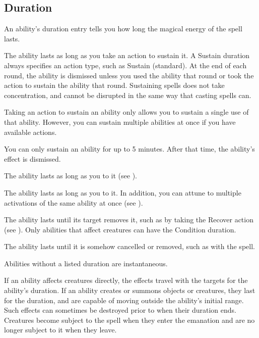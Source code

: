     \subsection{Duration}

        An ability's duration entry tells you how long the magical energy of the spell lasts.

         The ability lasts as long as you take an action to sustain it.
        A Sustain duration always specifies an action type, such as Sustain (standard).
        At the end of each round, the ability is dismissed unless you used the ability that round or took the action to sustain the ability that round.
        Sustaining spells does not take concentration, and cannot be disrupted in the same way that casting spells can.

        Taking an action to sustain an ability only allows you to sustain a single use of that ability.
        However, you can sustain multiple abilities at once if you have available actions.

        You can only sustain an ability for up to 5 minutes.
        After that time, the ability's effect is dismissed.

        \label{Attunement} The ability lasts as long as you  to it (see ).

         The ability lasts as long as you  to it.
        In addition, you can attune to multiple activations of the same ability at once (see ).

         The ability lasts until its target removes it, such as by taking the Recover action (see ).
        Only abilities that affect creatures can have the Condition duration.

         The ability lasts until it is somehow cancelled or removed, such as with the  spell.

         Abilities without a listed duration are instantaneous.

         If an ability affects creatures directly, the effects travel with the targets for the ability's duration.
        If an ability creates or summons objects or creatures, they last for the duration, and are capable of moving outside the ability's initial range.
        Such effects can sometimes be destroyed prior to when their duration ends.
        Creatures become subject to the spell when they enter the emanation and are no longer subject to it when they leave.

